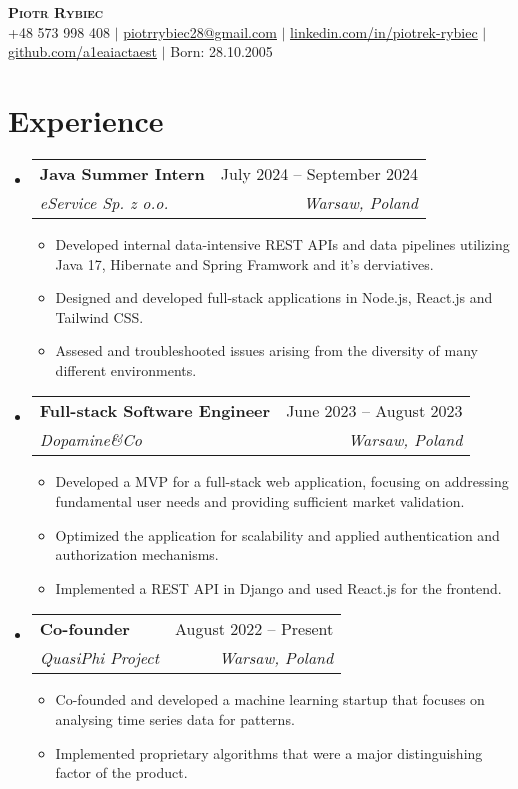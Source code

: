 \documentclass[letterpaper,11pt]{article}
\makeatletter
\newcommand{\resumeItem}[1]{
  \item\small{
    {#1 \vspace{-2pt}}
  }
}
\newcommand{\resumeSubheading}[4]{
  \vspace{-2pt}\item
    \begin{tabular*}{0.97\textwidth}[t]{l@{\extracolsep{\fill}}r}
      \textbf{#1} & #2 \\
      \textit{\small#3} & \textit{\small #4} \\
    \end{tabular*}\vspace{-7pt}
}
\newcommand{\resumeSubHeadingListStart}{\begin{itemize}[leftmargin=0.15in, label={}]}
\newcommand{\resumeSubHeadingListEnd}{\end{itemize}}
\newcommand{\resumeItemListStart}{\begin{itemize}}
\newcommand{\resumeItemListEnd}{\end{itemize}\vspace{-5pt}}
\makeatother
\begin{document}
\begin{center}
  \textbf{\Huge \scshape Piotr Rybiec} \\ \vspace{1pt}
  \small +48 573 998 408 $|$ \href{mailto:piotrrybiec28@gmail.com}{\underline{piotrrybiec28@gmail.com}} $|$
  \href{https://linkedin.com/in/piotrek-rybiec}{\underline{linkedin.com/in/piotrek-rybiec}} $|$
  \href{https://github.com/a1eaiactaest}{\underline{github.com/a1eaiactaest}} $|$
  Born: 28.10.2005
\end{center}

\section{Experience}
  \resumeSubHeadingListStart
    \resumeSubheading
      {Java Summer Intern}{July 2024 -- September 2024}
      {eService Sp. z o.o.}{Warsaw, Poland}
      \resumeItemListStart
        \resumeItem{Developed internal data-intensive REST APIs and data pipelines utilizing Java 17, Hibernate and Spring Framwork and it's derviatives.}
        \resumeItem{Designed and developed full-stack applications in Node.js, React.js and Tailwind CSS.}
        \resumeItem{Assesed and troubleshooted issues arising from the diversity of many different environments.}
      \resumeItemListEnd
    \resumeSubheading
      {Full-stack Software Engineer}{June 2023 -- August 2023}
      {Dopamine\&Co}{Warsaw, Poland}
      \resumeItemListStart
        \resumeItem{Developed a MVP for a full-stack web application, focusing on addressing fundamental user needs and providing sufficient market validation.}
        \resumeItem{Optimized the application for scalability and applied authentication and authorization mechanisms.}
        \resumeItem{Implemented a REST API in Django and used React.js for the frontend.}
      \resumeItemListEnd
    \resumeSubheading
      {Co-founder}{August 2022 -- Present}
      {QuasiPhi Project}{Warsaw, Poland}
      \resumeItemListStart
        \resumeItem{Co-founded and developed a machine learning startup that focuses on analysing time series data for patterns.}
        \resumeItem{Implemented proprietary algorithms that were a major distinguishing factor of the product.}
      \resumeItemListEnd
  \resumeSubHeadingListEnd
\end{document}
